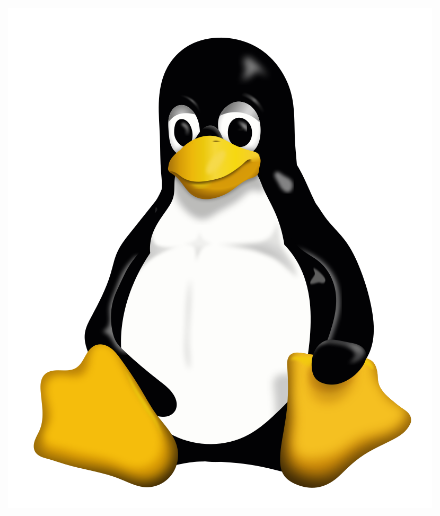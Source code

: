 \lipsum[1]
\begin{figure}
	\centering
	\includegraphics[width=0.24\paperwidth]{./img/linux/linux}
\end{figure}
\lipsum[1]

